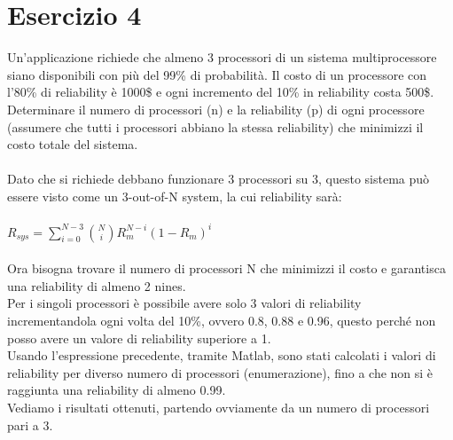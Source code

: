 	\section{Esercizio 4}
	Un'applicazione richiede che almeno 3 processori di un sistema multiprocessore siano disponibili con più del 99\% di probabilità. Il costo di un processore con l’80\% di reliability è 1000\$ e ogni incremento del 10\% in reliability costa 500\$. Determinare il numero di processori (n) e la reliability (p) di ogni processore (assumere che tutti i processori abbiano la stessa reliability) che minimizzi il costo totale del sistema.\\\\
	Dato che si richiede debbano funzionare 3 processori su 3, questo sistema può essere visto come un 3-out-of-N system, la cui reliability sarà:\\\\
	$ R_{sys}=\sum_{i=0}^{N-3}\binom{N}{i}R_{m}^{N-i}(1-R_{m})^{i} $ \\\\
	Ora bisogna trovare il numero di processori N che minimizzi il costo e garantisca una reliability di almeno 2 nines.\\
	Per i singoli processori è possibile avere solo 3 valori di reliability incrementandola ogni volta del 10\%, ovvero 0.8, 0.88 e 0.96, questo perché non posso avere un valore di reliability superiore a 1.\\
	Usando l'espressione precedente, tramite Matlab, sono stati calcolati i valori di reliability per diverso numero di processori (enumerazione), fino a che non si è raggiunta una reliability di almeno 0.99.\\
	Vediamo i risultati ottenuti, partendo ovviamente da un numero di processori pari a 3.
	
